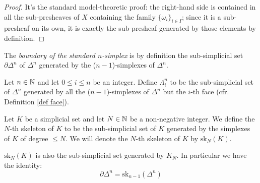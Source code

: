 \begin{refsection}
\begin{proof}
It's the standard model-theoretic proof: the right-hand side is contained in all the sub-presheaves of $X$ containing the family $\{\omega_i\}_{i \in I}$; since it is a sub-presheaf on its own, it is exactly the sub-presheaf generated by those elements by definition.
\end{proof}

\begin{defin}
The \emph{boundary of the standard $n$-simplex} is by definition the sub-simplicial set $\partial \Delta^n$ of $\Delta^n$ generated by the ($n-1$)-simplexes of $\Delta^n$.
\end{defin}

\begin{defin}
Let $n \in \mathbb{N}$ and let $0 \le i \le n$ be an integer. Define $\Lambda^n_i$ to be the sub-simplicial set of $\Delta^n$ generated by all the ($n-1$)-simplexes of $\Delta^n$ but the $i$-th face (cfr. Definition \ref{def face}).
\end{defin}

\begin{defin}
Let $K$ be a simplicial set and let $N \in \mathbb{N}$ be a non-negative integer. We define the $N$-th skeleton of $K$ to be the sub-simplicial set of $K$ generated by the simplexes of $K$ of degree $\le N$. We will denote the $N$-th skeleton of $K$ by $\mathrm{sk}_N(K)$.
\end{defin}

\begin{rmk}
$\mathrm{sk}_N(K)$ is also the sub-simplicial set generated by $K_N$. In particular we have the identity:
\[
\partial \Delta^n = \mathrm{sk}_{n-1}(\Delta^n)
\]
\end{rmk}

%
%
%


\end{refsection}
